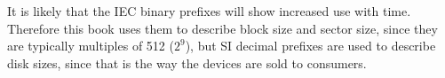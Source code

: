 It is likely that the IEC binary prefixes will show increased use
with time. Therefore this book uses them to describe block size and
sector size, since they are typically multiples of 512 ($2^9$), but 
SI decimal prefixes are used to describe disk sizes, since that is the way
the devices are sold to consumers.




